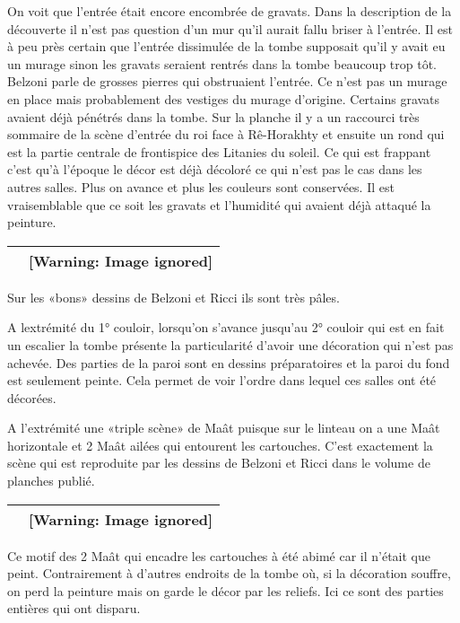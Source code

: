 \documentclass{article}
\begin{document}
On voit que  l’entrée  était encore encombrée de gravats. Dans la
description de la découverte il n’est pas question d’un mur qu’il
aurait fallu briser à l’entrée. Il est à peu près certain que l’entrée
dissimulée de la tombe supposait qu’il y avait eu un murage sinon les
gravats seraient rentrés dans la tombe beaucoup trop tôt. Belzoni parle
de grosses pierres qui obstruaient l’entrée. Ce n’est pas un murage en
place mais probablement des vestiges du murage d’origine. Certains
gravats avaient déjà pénétrés dans la tombe. Sur la planche il y a un
raccourci très sommaire de la scène d’entrée du roi face à Rê-Horakhty
et ensuite un rond qui est la partie centrale de frontispice des
Litanies du soleil. Ce qui est frappant c’est qu’à l’époque le décor
est déjà décoloré ce qui n’est pas le cas dans les autres salles. Plus
on avance et plus les couleurs sont conservées.  Il est vraisemblable
que ce soit les gravats et l’humidité qui avaient déjà attaqué la
peinture. 

\begin{flushleft}
\tablehead{}
\begin{supertabular}{|l|l|}
  &   [Warning: Image ignored] %
 \\\hline
\end{supertabular}
\end{flushleft}
Sur les «bons» dessins de Belzoni et Ricci ils sont très pâles.

A l{\textquotesingle}extrémité du 1° couloir, lorsqu’on s’avance
jusqu’au 2° couloir qui est en fait un escalier la tombe présente la
particularité d’avoir une décoration qui n’est pas achevée. Des parties
de la paroi sont en dessins préparatoires et la paroi du fond est
seulement peinte. Cela permet de voir l’ordre dans lequel ces salles
ont été décorées. 

A l’extrémité une «triple scène» de Maât puisque sur le linteau on a une
Maât horizontale et 2 Maât ailées qui entourent les cartouches. C’est
exactement la scène qui est reproduite par les dessins de Belzoni et
Ricci dans le volume de planches publié. 

\begin{flushleft}
\tablehead{}
\begin{supertabular}{|l|l|}
  &   [Warning: Image ignored] %
 \\\hline
\end{supertabular}
\end{flushleft}
Ce motif des 2 Maât qui encadre les cartouches à été abimé car il
n’était que peint. Contrairement à d’autres endroits de la tombe où, si
la décoration souffre, on perd la peinture mais on garde le décor par
les reliefs. Ici ce sont des parties entières qui ont disparu.
\end{document}
